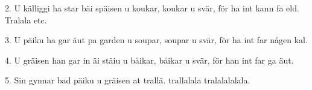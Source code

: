2. U källiggi ha star bäi späisen u koukar,
   koukar u svär, för ha int kann fa eld.
   Tralala etc.

3. U päiku ha gar äut pa garden u soupar,
   soupar u svär, för ha int far någen kal.

4. U gräisen han gar in äi stäiu u båikar,
   båikar u svär, för han int far ga äut.

5. Sin gynnar bad päiku u gräisen at trallä.
   trallalala tralalalalala.
